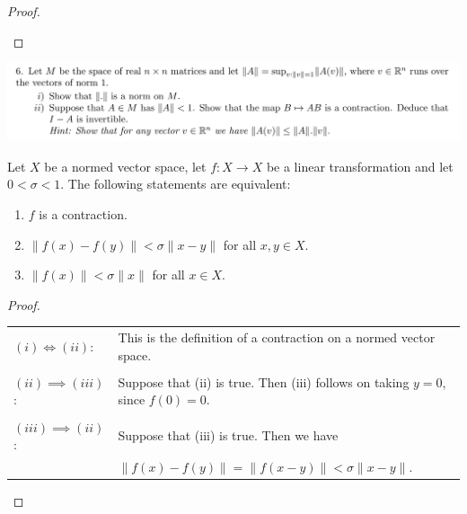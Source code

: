 \documentclass[12pt]{article}
\begin{document}
\begin{enumerate}[label=(\roman*)]
\begin{proof}
\begin{enumerate}
    \end{enumerate}
  \end{proof}


  \newpage
  \begin{mdframed}
    \includegraphics[width=400pt]{img/oxford-a2-2-6.png}
  \end{mdframed}

  \begin{lemma}\label{a2-2-6-lemma-1}
    Let $X$ be a normed vector space, let $f:X \to X$ be a linear transformation and let
    $0 < \sigma < 1$. The following statements are equivalent:
    \begin{enumerate}[label=(\roman*)]
    \item $f$ is a contraction.
    \item $\|f(x) - f(y)\| < \sigma \|x - y\|$ for all $x, y \in X$.
    \item $\|f(x)\| < \sigma \|x\|$ for all $x \in X$.
    \end{enumerate}
  \end{lemma}

  \begin{proof}\hspace{0pt}\\
    \begin{tabular}{ll}
      $(i) \iff (ii)$: &This is the definition of a contraction on a normed vector space.\\
      \\
      $(ii) \implies (iii)$: &Suppose that (ii) is true. Then (iii) follows on taking $y = 0$, since
                               $f(0) = 0$.\\
      \\
      $(iii) \implies (ii)$: &Suppose that (iii) is true. Then we have\\
                       & $\|f(x) - f(y)\| = \|f(x - y)\| < \sigma \|x - y\|.$
    \end{tabular}
  \end{proof}


\end{enumerate}
\end{document}
